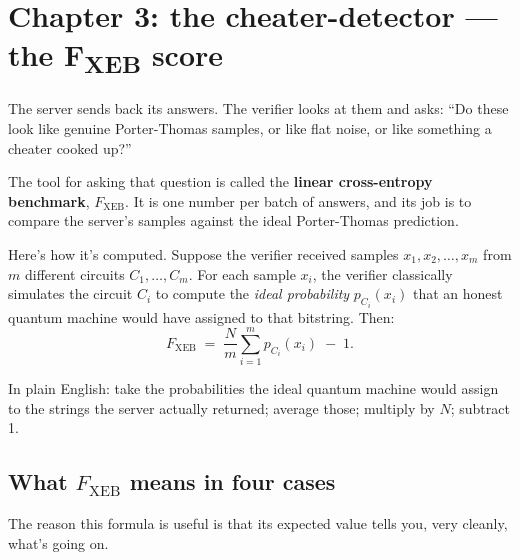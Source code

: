 \documentclass[11pt]{article}
\newcommand{\formula}[1]{\[\boxed{#1}\]}
\newcommand{\Fxeb}{F_{\text{XEB}}}
\begin{document}
\section{Chapter 3: the cheater-detector --- the F\textsubscript{XEB} score}

The server sends back its answers. The verifier looks at them and asks: ``Do these look like genuine Porter-Thomas samples, or like flat noise, or like something a cheater cooked up?''

The tool for asking that question is called the \textbf{linear cross-entropy benchmark}, $\Fxeb$. It is one number per batch of answers, and its job is to compare the server's samples against the ideal Porter-Thomas prediction.

Here's how it's computed. Suppose the verifier received samples $x_1, x_2, \ldots, x_m$ from $m$ different circuits $C_1, \ldots, C_m$. For each sample $x_i$, the verifier classically simulates the circuit $C_i$ to compute the \emph{ideal probability} $p_{C_i}(x_i)$ that an honest quantum machine would have assigned to that bitstring. Then:
\formula{\Fxeb \;=\; \frac{N}{m}\sum_{i=1}^{m} p_{C_i}(x_i) \;-\; 1.}

\noindent In plain English: take the probabilities the ideal quantum machine would assign to the strings the server actually returned; average those; multiply by $N$; subtract 1.

\subsection*{What $\Fxeb$ means in four cases}

The reason this formula is useful is that its expected value tells you, very cleanly, what's going on.
\end{document}
